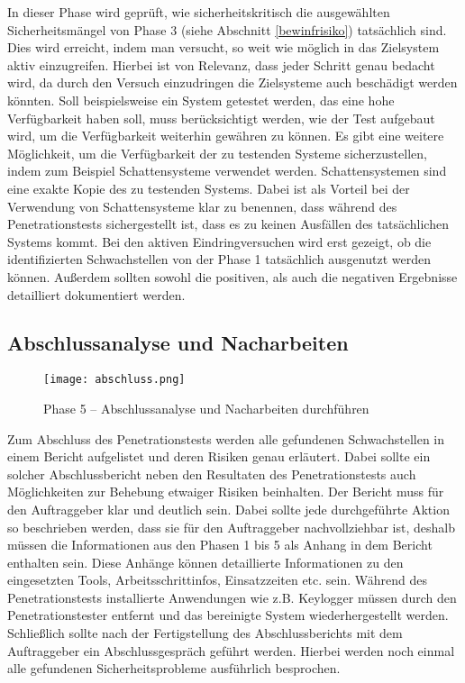 In dieser Phase wird geprüft, wie sicherheitskritisch die ausgewählten Sicherheitsmängel von Phase 3 (siehe Abschnitt \ref{bewinfrisiko}) tatsächlich sind. Dies wird erreicht, indem man versucht, so weit wie möglich in das Zielsystem aktiv einzugreifen. Hierbei ist von Relevanz, dass jeder Schritt genau bedacht wird, da durch den Versuch einzudringen die Zielsysteme auch beschädigt werden könnten. Soll beispielsweise ein System getestet werden, das eine hohe Verfügbarkeit haben soll, muss berücksichtigt werden, wie der Test aufgebaut wird, um die Verfügbarkeit weiterhin gewähren zu können.  Es gibt eine weitere Möglichkeit, um die Verfügbarkeit der zu testenden Systeme sicherzustellen, indem zum Beispiel Schattensysteme verwendet werden. Schattensystemen sind eine exakte Kopie des zu testenden Systems. Dabei ist als Vorteil bei der Verwendung von Schattensysteme klar zu benennen, dass während des Penetrationstests sichergestellt ist, dass es zu keinen Ausfällen des tatsächlichen Systems kommt. Bei den aktiven Eindringversuchen wird erst gezeigt, ob die identifizierten Schwachstellen von der Phase 1 tatsächlich ausgenutzt werden können. Außerdem sollten sowohl die positiven, als auch die negativen Ergebnisse detailliert dokumentiert werden\cite[104--105]{pt03bsi}.

\subsection{Abschlussanalyse und Nacharbeiten}

\begin{figure}[h]
	\centering
	\texttt{[image: abschluss.png]}
	\caption{Phase 5 – Abschlussanalyse und Nacharbeiten durchführen}
\end{figure}

Zum Abschluss des Penetrationstests werden alle gefundenen Schwachstellen in einem Bericht aufgelistet und deren Risiken genau erläutert. Dabei sollte ein solcher Abschlussbericht neben den Resultaten des Penetrationstests auch Möglichkeiten zur Behebung etwaiger Risiken beinhalten. Der Bericht muss für den Auftraggeber klar und deutlich sein. Dabei sollte jede durchgeführte Aktion so beschrieben werden, dass sie für den Auftraggeber nachvollziehbar ist, deshalb müssen die Informationen aus den Phasen 1 bis 5 als Anhang in dem Bericht enthalten sein. 
Diese Anhänge können detaillierte Informationen zu den eingesetzten Tools, Arbeitsschrittinfos, Einsatzzeiten etc. sein. Während des Penetrationstests installierte Anwendungen wie z.B. Keylogger müssen durch den Penetrationstester entfernt und das bereinigte System wiederhergestellt werden. Schließlich sollte nach der Fertigstellung des Abschlussberichts mit dem Auftraggeber ein Abschlussgespräch geführt werden. Hierbei werden noch einmal alle gefundenen Sicherheitsprobleme ausführlich besprochen\cite[105--106]{pt03bsi}.

